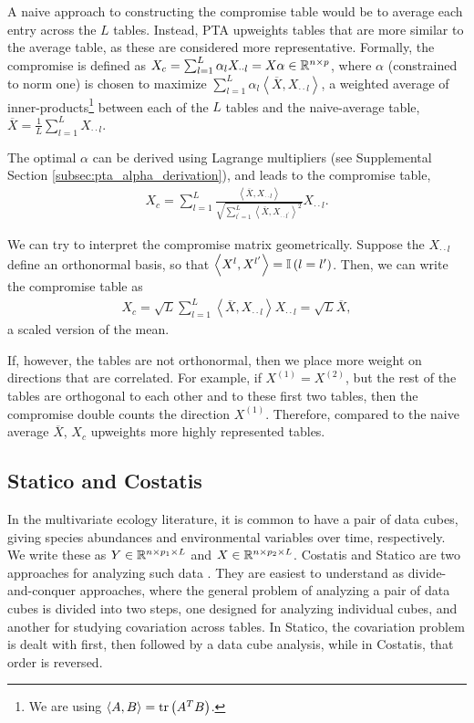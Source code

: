 \documentclass[14pt]{extarticle}
\begin{document}
A naive approach to constructing the compromise table would be to average each
entry across the $L$ tables. Instead, PTA upweights tables that are more similar
to the average table, as these are considered more representative. Formally, the
compromise is defined as $X_c = \sum_{l = 1}^{L}\alpha_{l} X_{\cdot\cdot l}
= X\alpha \in \mathbb{R}^{n \times p}$, where $\alpha$ (constrained to norm one) is
chosen to maximize $\sum_{l = 1}^{L} \alpha_{l} \left<\overline{X},
X_{\cdot\cdot l}\right>$, a weighted average of inner-products\footnote{We are
  using $\left<A, B\right> = \mathop\mathrm{tr}\left(A^{T}B\right)$.} between each of the $L$
tables and the naive-average table, $\overline{X} = \frac{1}{L}\sum_{l = 1}^{L}
X_{\cdot\cdot l}$.

The optimal $\alpha$ can be derived using Lagrange multipliers (see Supplemental
Section \ref{subsec:pta_alpha_derivation}), and leads to the compromise table,
\begin{align*}
  X_{c} = \sum_{l = 1}^{L} \frac{\left<\overline{X}, X_{\cdot\cdot l}\right>}{\sqrt{\sum_{l^{\prime}
      =1}^{L}\left<\overline{X},
      X_{\cdot\cdot l^{\prime}}\right>^{2}}} X_{\cdot\cdot l}.
\end{align*}

We can try to interpret the compromise matrix geometrically. Suppose
the $X_{\cdot\cdot l}$ define an orthonormal basis, so that $\left<X^{l},
  X^{l^{\prime}}\right> = \mathbb{I}\left({l = l^{\prime}}\right)$. Then, we can write
the compromise table as
\begin{align*}
  X_{c} = \sqrt{L}\sum_{l = 1}^{L}\left<\overline{X},
    X_{\cdot\cdot l}\right>X_{\cdot\cdot l} = \sqrt{L}\overline{X},
\end{align*}
a scaled version of the mean.

If, however, the tables are not orthonormal, then we place more weight on
directions that are correlated. For example, if $X^{(1)} = X^{(2)}$, but the
rest of the tables are orthogonal to each other and to these first two tables,
then the compromise double counts the direction $X^{(1)}$. Therefore, compared
to the naive average $\overline{X}$, $X_c$ upweights more highly represented
tables.

\subsection{Statico and Costatis}
\label{subsec:statico_and_costatis}

In the multivariate ecology literature, it is common to have a pair of data
cubes, giving species abundances and environmental variables over time,
respectively. We write these as $Y \in \mathbb{R}^{n \times p_{1} \times L}$ and $X
\in \mathbb{R}^{n \times p_{2} \times L}$. Costatis and Statico are two approaches
for analyzing such data \citep{thioulouse2011simultaneous}. They are easiest to
understand as divide-and-conquer approaches, where the general problem of
analyzing a pair of data cubes is divided into two steps, one designed for
analyzing individual cubes, and another for studying covariation across tables.
In Statico, the covariation problem is dealt with first, then followed by a data
cube analysis, while in Costatis, that order is reversed.
\end{document}
